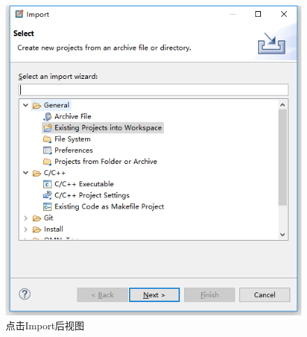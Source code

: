 \begin{figure}
	\centering
	\includegraphics[width=\textwidth]{../img/chapter2/click_import}
	\caption{点击Import后视图}\label{fig:1a}	
\end{figure}

